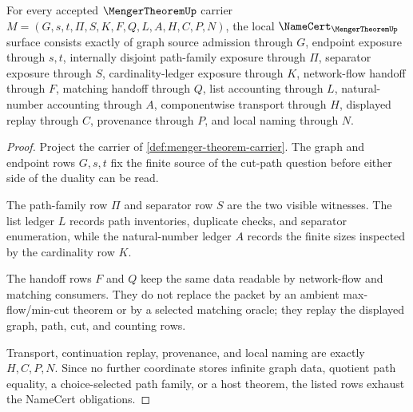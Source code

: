 \begin{theorem}
\label{thm:menger-theorem-namecert-obligations}
For every accepted $\MengerTheoremUp$ carrier $M=(G,s,t,\Pi,S,K,F,Q,L,A,H,C,P,N)$, the local $\NameCert_{\MengerTheoremUp}$ surface consists exactly of graph source admission through $G$, endpoint exposure through $s,t$, internally disjoint path-family exposure through $\Pi$, separator exposure through $S$, cardinality-ledger exposure through $K$, network-flow handoff through $F$, matching handoff through $Q$, list accounting through $L$, natural-number accounting through $A$, componentwise transport through $H$, displayed replay through $C$, provenance through $P$, and local naming through $N$.
\end{theorem}
\begin{proof}
Project the carrier of \autoref{def:menger-theorem-carrier}. The graph and endpoint rows $G,s,t$ fix the finite source of the cut-path question before either side of the duality can be read.

The path-family row $\Pi$ and separator row $S$ are the two visible witnesses. The list ledger $L$ records path inventories, duplicate checks, and separator enumeration, while the natural-number ledger $A$ records the finite sizes inspected by the cardinality row $K$.

The handoff rows $F$ and $Q$ keep the same data readable by network-flow and matching consumers. They do not replace the packet by an ambient max-flow/min-cut theorem or by a selected matching oracle; they replay the displayed graph, path, cut, and counting rows.

Transport, continuation replay, provenance, and local naming are exactly $H,C,P,N$. Since no further coordinate stores infinite graph data, quotient path equality, a choice-selected path family, or a host theorem, the listed rows exhaust the NameCert obligations.
\end{proof}

